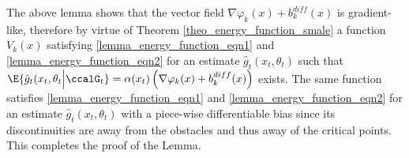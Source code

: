 \documentclass[article]{IEEEtran}
\theoremstyle{definition}
\begin{document}
%
The above lemma shows that the vector field $\nabla \varphi_k(x)+b^{diff}_k(x)$ is gradient-like, therefore by virtue of Theorem \ref{theo_energy_function_smale} a function $V_k(x)$ satisfying \eqref{lemma_energy_function_eqn1} and \eqref{lemma_energy_function_eqn2} for an estimate $\hat{g}_t(x_t,\theta_t)$ such that $\E{\hat{g}_t(x_t,\theta_t\Big| \ccalG_t} = \alpha(x_t)\left(\nabla \varphi_k(x)+b^{diff}_k(x)\right)$ exists. The same function satisfies \eqref{lemma_energy_function_eqn1} and \eqref{lemma_energy_function_eqn2} for an estimate $\hat{g}_t(x_t,\theta_t)$ with a piece-wise differentiable bias since its discontinuities are away from the obstacles and thus away of the critical points. This completes the proof of the Lemma.
%
%
\end{document}
